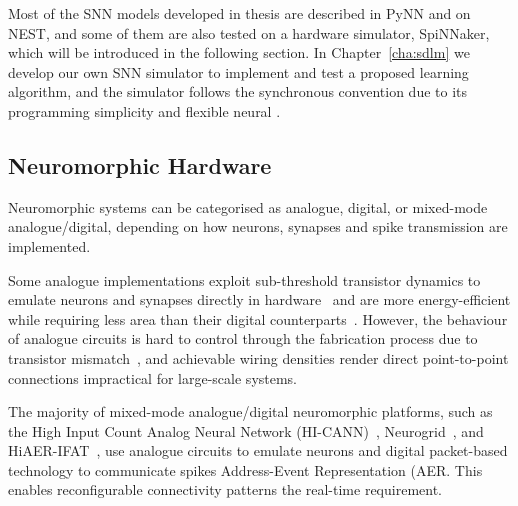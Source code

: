 Most of the SNN models developed in \DIFdelbegin {}\DIFdelend \DIFaddbegin {}\DIFaddend thesis are described in PyNN and \DIFdelbegin {}\DIFdelend \DIFaddbegin {}\DIFaddend on NEST, and some of them are also tested on a hardware simulator, SpiNNaker\DIFaddbegin {}\DIFaddend , which will be introduced in the following section.
In Chapter~\ref{cha:sdlm} we develop our own SNN simulator to implement and test a proposed learning algorithm, and the simulator follows the synchronous convention due to its programming simplicity and flexible neural \DIFdelbegin {}\DIFdelend \DIFaddbegin {}\DIFaddend . 

\subsection{Neuromorphic Hardware}
\label{subsec:neuromorphic_hw}
Neuromorphic systems can be categorised as analogue, digital, or mixed-mode analogue/digital, depending on how neurons, synapses and spike transmission are implemented. %
\DIFdelbegin %

\DIFdelend Some analogue implementations exploit sub-threshold transistor dynamics to emulate neurons and synapses directly in hardware~\citep{indiveri2011neuromorphic} and are more energy-efficient while requiring less area than their digital counterparts~\citep{joubert2012hardware}.
However, the behaviour of analogue circuits is hard to control through the fabrication process due to transistor mismatch~\citep{indiveri2011neuromorphic,pedram2006thermal,linares2003compact}, and achievable \DIFdelbegin {}\DIFdelend wiring densities render direct point-to-point connections impractical for large-scale systems.

The majority of mixed-mode analogue/digital neuromorphic platforms, such as the High Input Count Analog Neural Network (HI-CANN)~\citep{schemmel2010wafer}, Neurogrid~\citep{benjamin2014neurogrid}, and HiAER-IFAT~\citep{yu201265k}, use analogue circuits to emulate neurons and digital packet-based technology to communicate spikes \DIFdelbegin {}\DIFdelend \DIFaddbegin {}\DIFaddend Address-Event Representation (AER\DIFdelbegin {}\DIFdelend \DIFaddbegin {}\DIFaddend .
This enables reconfigurable connectivity patterns \DIFdelbegin {}\DIFdelend \DIFaddbegin {}\DIFaddend the real-time requirement.

